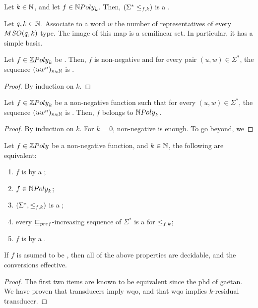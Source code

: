 \begin{lemma}
    \label{n-poly-k-implies-wqo:lemma}
    Let $k \in \mathbb{N}$, and let $f \in \NPoly[k]$.
    Then, $(\Sigma^* \mathrel{\leq_{{f},{k}}})$ is a .
\end{lemma}


\begin{conjecture}
    Let $q,k \in \mathbb{N}$.
    Associate to a word $w$ the number of representatives
    of every $\MSO(q,k)$ type. 
    The image of this map is a semilinear set.
    In particular, it has a simple basis.
\end{conjecture}

\begin{conjecture}
    Let $f \in \ZPoly[k]$
    be .
    Then, $f$ is non-negative and for every pair
    $(u,w) \in \Sigma^*$,
    the sequence $(u w^n)_{n \in \mathbb{N}}$
    is .
\end{conjecture}
\begin{proof}
    By induction on $k$.
\end{proof}

\begin{conjecture}
    Let $f \in \ZPoly[k]$
    be a non-negative function such that for every
    $(u,w) \in \Sigma^*$,
    the sequence $(u w^n)_{n \in \mathbb{N}}$
    is .
    Then, $f$ belongs to $\NPoly[k]$.
\end{conjecture}
\begin{proof}
    By induction on $k$.
    For $k = 0$, non-negative is enough.
    To go beyond, we

\end{proof}

\begin{theorem}
    \label{non-commutative-npoly:thm}
    Let $f \in \ZPoly$ be a non-negative function, 
    and $k \in \mathbb{N}$,
    the following are equivalent:
    \begin{enumerate}
        \item $f$ is 
            by a ;
        \item $f \in \NPoly[k]$;
        \item $(\Sigma^*, \mathrel{\leq_{{f},{k}}})$ is a
            ;
        \item every $\prefleq$-increasing sequence
            of $\Sigma^*$  is a 
            for $\mathrel{\leq_{{f},{k}}}$;
        \item $f$ is  by a
            .
    \end{enumerate}
    If $f$ is asumed to be , then all of the above
    properties are decidable, and the conversions effective.
\end{theorem}
\begin{proof}
    The first two items are known to be equivalent since 
    the phd of gaëtan.
    We have proven that transducers imply
    wqo, and that wqo implies $k$-residual transducer.
\end{proof}

